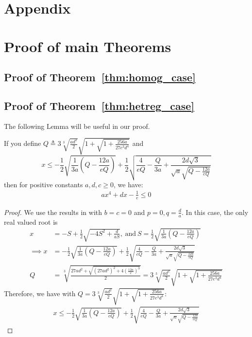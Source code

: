 \section{Appendix}
\section{Proof of main Theorems}
\subsection{Proof of Theorem~\ref{thm:homog_case}}

\subsection{Proof of Theorem~\ref{thm:hetreg_case}}
The following Lemma will be useful in our proof. 
\begin{lemma}
If you define $Q\triangleq3\sqrt[3]{\frac{ad^2}{2}}\sqrt{1+\sqrt{1+\frac{256 a}{27e^3d^4}}}$ and $$x\leq -\frac{1}{2}\sqrt{\frac{1}{3a}\left(Q-\frac{12a}{eQ}\right)}+\frac{1}{2}\sqrt{\frac{4}{eQ}-\frac{Q}{3a}+\frac{2d\sqrt{3}}{\sqrt{a}\sqrt{Q-\frac{12a}{e Q}}}}$$ then for positive constants $a,d,c\geq 0$, we have:
\begin{align}
    ax^{4}+dx-\frac{1}{e}\leq 0
\end{align}
\end{lemma}
\begin{proof}
We use the results in \cite{wiki:xxx} with $b=c=0$ and $p=0, q=\frac{d}{a}$. In this case, the only real valued root is 
\begin{align}
x&=-S+\frac{1}{2}\sqrt{-4S^2+\frac{d}{aS}},\:\text{and}\:S=\frac{1}{2}\sqrt{\frac{1}{3a}\left(Q-\frac{12a}{eQ}\right)}\nonumber\\
\implies x&=-\frac{1}{2}\sqrt{\frac{1}{3a}\left(Q-\frac{12a}{eQ}\right)}+\frac{1}{2}\sqrt{\frac{4}{eQ}-\frac{Q}{3a}+\frac{2d\sqrt{3}}{\sqrt{a}\sqrt{Q-\frac{12a}{e Q}}}} \nonumber\\
Q&=\sqrt[3]{\frac{{27a}{d^2}+\sqrt{\left({27a}{d^2}\right)^2+4\left(\frac{12a}{e}\right)^3}}{2}}=3\sqrt[3]{\frac{ad^2}{2}}\sqrt{1+\sqrt{1+\frac{256 a}{27e^3d^4}}}
\end{align} 
Therefore, we have with $Q=3\sqrt[3]{\frac{ad^2}{2}}\sqrt{1+\sqrt{1+\frac{256 a}{27e^3d^4}}}$:
\begin{align}
    x\leq -\frac{1}{2}\sqrt{\frac{1}{3a}\left(Q-\frac{12a}{eQ}\right)}+\frac{1}{2}\sqrt{\frac{4}{eQ}-\frac{Q}{3a}+\frac{2d\sqrt{3}}{\sqrt{a}\sqrt{Q-\frac{12a}{e Q}}}}
\end{align}
\end{proof}

